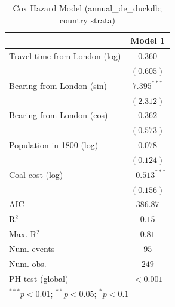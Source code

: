 
\begin{table}
\begin{center}
\begin{tabular}{l c}
\hline
 & Model 1 \\
\hline
Travel time from London (log) & $0.360$ \\
 & $(0.605)$ \\
Bearing from London (sin) & $7.395^{***}$ \\
 & $(2.312)$ \\
Bearing from London (cos) & $0.362$ \\
 & $(0.573)$ \\
Population in 1800 (log) & $0.078$ \\
 & $(0.124)$ \\
Coal cost (log) & $-0.513^{***}$ \\
 & $(0.156)$ \\
\hline
AIC              & $386.87$ \\
R$^2$            & $0.15$ \\
Max. R$^2$       & $0.81$ \\
Num. events      & $95$ \\
Num. obs.        & $249$ \\
PH test (global) & $<0.001$ \\
\hline
\multicolumn{2}{l}{\scriptsize{$^{***}p<0.01$; $^{**}p<0.05$; $^{*}p<0.1$}}
\end{tabular}
\caption{Cox Hazard Model (annual\_de\_duckdb; country strata)}
\label{tab:cox_serious_strata_annual_de_duckdb}
\end{center}
\end{table}
